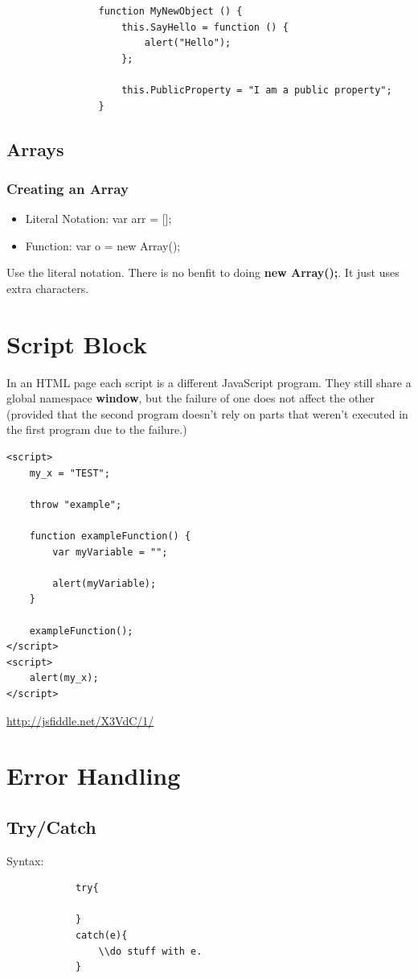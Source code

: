 \documentclass {amsart}
\begin{document}
			\begin{lstlisting}
				function MyNewObject () {
					this.SayHello = function () {
						alert("Hello");
					};
					
					this.PublicProperty = "I am a public property";
				}
			\end{lstlisting}

	\subsection{Arrays}
		\subsubsection {Creating an Array}
			\begin{itemize}
				\item Literal Notation: var arr = [];
				\item Function: var o = new Array();
			\end{itemize}
		Use the literal notation.  There is no benfit to doing {\bf new Array();}.  It just uses extra characters. 
	
	
\section{Script Block}
	In an HTML page each script is a different JavaScript program.  They still share a global namespace {\bf window}, but the failure of one does not affect the other (provided that the second program doesn't rely on parts that weren't executed in the first program due to the failure.)

\begin{lstlisting}
<script>
    my_x = "TEST";

    throw "example";

    function exampleFunction() {
        var myVariable = "";

        alert(myVariable);
    }

    exampleFunction();
</script>
<script>
    alert(my_x);
</script>
\end{lstlisting}
\url{http://jsfiddle.net/X3VdC/1/}

\section{Error Handling}
	\subsection{Try/Catch}   Syntax: 
		\begin{lstlisting}
			try{

			}
			catch(e){
				\\do stuff with e.		
			}
		\end{lstlisting}
\end{document}
